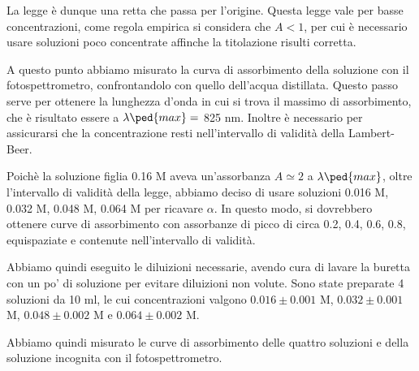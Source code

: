 La legge è dunque una retta che passa per l'origine. Questa legge vale per basse
concentrazioni, come regola empirica si considera che $A < 1$, per cui è necessario
usare soluzioni poco concentrate affinche la titolazione risulti corretta.

A questo punto abbiamo misurato la curva di assorbimento della soluzione con il
fotospettrometro, confrontandolo con quello dell'acqua distillata. Questo passo
serve per ottenere la lunghezza d'onda in cui si trova il massimo di assorbimento,
che è risultato essere a $\lambda\ped{max} =$ 825 nm. Inoltre è necessario per
assicurarsi che la concentrazione resti nell'intervallo di validità della Lambert-Beer.

Poichè la soluzione figlia 0.16 M aveva un'assorbanza $A \simeq 2$ a $\lambda\ped{max}$,
oltre l'intervallo di validità della legge, abbiamo deciso di usare soluzioni
0.016 M, 0.032 M, 0.048 M, 0.064 M per ricavare $\alpha$. In questo modo, si dovrebbero
ottenere curve di assorbimento con assorbanze di picco di circa 0.2, 0.4, 0.6, 0.8,
equispaziate e contenute nell'intervallo di validità.

Abbiamo quindi eseguito le diluizioni necessarie, avendo cura di lavare la buretta con
un po' di soluzione per evitare diluizioni non volute. Sono state preparate 4 soluzioni
da 10 ml, le cui concentrazioni valgono $0.016 \pm 0.001$ M, $0.032 \pm 0.001$ M,
$0.048 \pm 0.002$ M e $0.064 \pm 0.002$ M.

Abbiamo quindi misurato le curve di assorbimento delle quattro soluzioni e della
soluzione incognita con il fotospettrometro.


